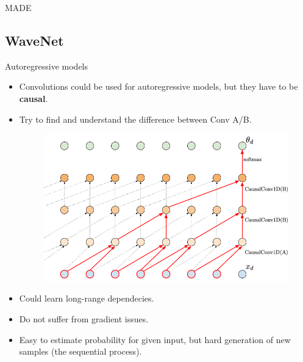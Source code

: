 \begin{frame}{MADE}
\begin{minipage}[t]{0.41\columnwidth}
\begin{figure}
		\end{figure}
	\end{minipage}
\end{frame}
\subsection{WaveNet}
\begin{frame}{Autoregressive models}
	\begin{itemize}
		\item Convolutions could be used for autoregressive models, but they have to be \textbf{causal}. \\
		\item Try to find and understand the difference between Conv A/B.
		\begin{figure}
			\centering
			\includegraphics[width=0.7\linewidth]{figs/sequential_CNN}
		\end{figure}
		\item Could learn long-range dependecies.
		\item Do not suffer from gradient issues.
		\item Easy to estimate probability for given input, but hard generation of new samples (the sequential process).
	\end{itemize}
\end{frame}
